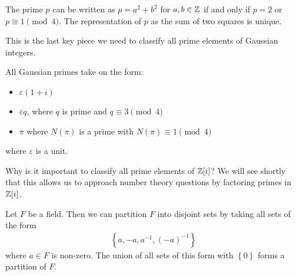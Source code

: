 \documentclass{memoir}
\begin{document}
\begin{thm}
	The prime \(p\) can be written as \(p = a^2+b^2\) for \(a,b \in \mathbb{Z}\) if and only if \(p = 2\) or \(p \cong 1 \pmod{4}\). The representation of \(p\) as the sum of two squares is unique.
\end{thm}
This is the last key piece we need to classify all prime elements of Gaussian integers.
\begin{thm}
	All Gaussian primes take on the form:
	\begin{itemize}
		\item \(\varepsilon(1+i)\) 
		\item \(\varepsilon q\), where \(q\) is prime and \(q \equiv 3 \pmod{4}\) 
		\item \(\pi\) where \(N(\pi)\) is a prime with \(N(\pi ) \equiv 1 \pmod{4}\)
	\end{itemize}
	where \(\varepsilon\) is a unit.
\end{thm}
Why is it important to classify all prime elements of \(\mathbb{Z}[i]\)? We will see shortly that this allows us to approach number theory questions by factoring primes in \(\mathbb{Z}[i]\).

\begin{prop}
	Let \(F\) be a field. Then we can partition \(F\) into disjoint sets by taking all sets of the form
	\begin{align*}
		\left\{ a, -a, a^{-1}, (-a)^{-1} \right\} 
	\end{align*}
	where \(a\in F\) is non-zero. The union of all sets of this form with \(\left\{ 0 \right\} \) forms a partition of \(F\).
\end{prop}
\end{document}
